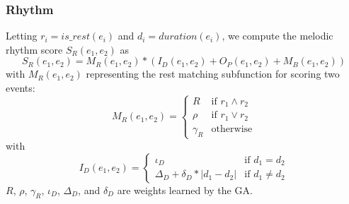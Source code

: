 \documentclass[phd,electronic,oneside,twosidetoc,letterpaper,chaptercenter,parttop,lof,lot]{byumsphd}
\begin{document}
\subsubsection{Rhythm}

Letting $r_i = is\_rest(e_i)$ and $d_i = duration(e_i)$, we compute the melodic rhythm score $S_R(e_1,e_2)$ as 
\[
S_R(e_1,e_2) = M_R(e_1,e_2) * (I_D(e_1,e_2) + O_P(e_1,e_2) + M_B(e_1,e_2))
\]
\noindent with $M_R(e_1,e_2)$ representing the rest matching subfunction for scoring two events:
\[ M_R(e_1,e_2) = 
  \begin{cases}
  	R & \text{if } r_1 \land r_2 \\
    \rho & \text{if } r_1 \lor r_2 \\
    \gamma_R & \text{otherwise}
  \end{cases}
\]
\noindent with
\[ I_D(e_1,e_2) = 
  \begin{cases}
  	\iota_D & \text{if } d_1 = d_2 \\
    \Delta_D + \delta_D * |d_1-d_2| & \text{if } d_1 \neq d_2
  \end{cases}
\]
\noindent $R$, $\rho$, $\gamma_R$, $\iota_D$, $\Delta_D$, and $\delta_D$ are weights learned by the GA.
\end{document}

